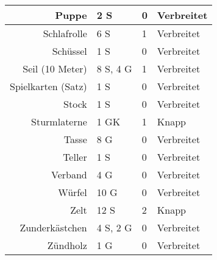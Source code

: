 \documentclass[a4paper, fontsize=9pt]{scrartcl}
\begin{document}
\begin{table}[ht!]
\begin{minipage}[c][\textheight][t]{.5\linewidth}
\begin{tabularx}{0.95\linewidth}{Rlll}
            Puppe               & 2 S            & 0           & Verbreitet     \\ \hline
            Schlafrolle         & 6 S            & 1           & Verbreitet     \\ \hline
            Schüssel            & 1 S            & 0           & Verbreitet     \\ \hline
            Seil (10 Meter)     & 8 S, 4 G       & 1           & Verbreitet     \\ \hline
            Spielkarten (Satz)  & 1 S            & 0           & Verbreitet     \\ \hline
            Stock               & 1 S            & 0           & Verbreitet     \\ \hline
            Sturmlaterne        & 1 GK           & 1           & Knapp          \\ \hline
            Tasse               & 8 G            & 0           & Verbreitet     \\ \hline
            Teller              & 1 S            & 0           & Verbreitet     \\ \hline
            Verband             & 4 G            & 0           & Verbreitet     \\ \hline
            Würfel              & 10 G           & 0           & Verbreitet     \\ \hline
            Zelt                & 12 S           & 2           & Knapp          \\ \hline
            Zunderkästchen      & 4 S, 2 G       & 0           & Verbreitet     \\ \hline
            Zündholz            & 1 G            & 0           & Verbreitet
        \end{tabularx}
    \end{minipage}
\end{table}

\clearpage
\end{document}
